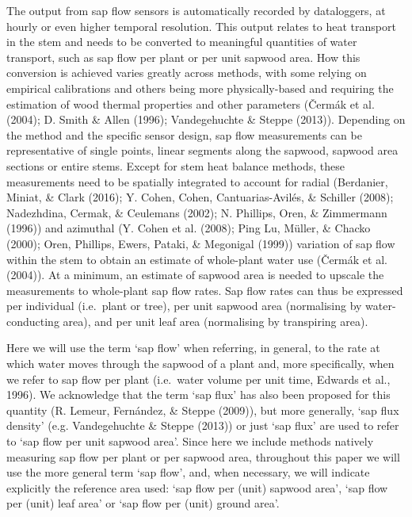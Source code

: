 \documentclass[11pt,twoside]{reedthesis}
\begin{document}
The output from sap flow sensors is automatically recorded by
dataloggers, at hourly or even higher temporal resolution. This output
relates to heat transport in the stem and needs to be converted to
meaningful quantities of water transport, such as sap flow per plant or
per unit sapwood area. How this conversion is achieved varies greatly
across methods, with some relying on empirical calibrations and others
being more physically-based and requiring the estimation of wood thermal
properties and other parameters (Čermák et al. (2004); D. Smith \& Allen
(1996); Vandegehuchte \& Steppe (2013)). Depending on the method and the
specific sensor design, sap flow measurements can be representative of
single points, linear segments along the sapwood, sapwood area sections
or entire stems. Except for stem heat balance methods, these
measurements need to be spatially integrated to account for radial
(Berdanier, Miniat, \& Clark (2016); Y. Cohen, Cohen, Cantuarias-Avilés,
\& Schiller (2008); Nadezhdina, Cermak, \& Ceulemans (2002); N.
Phillips, Oren, \& Zimmermann (1996)) and azimuthal (Y. Cohen et al.
(2008); Ping Lu, Müller, \& Chacko (2000); Oren, Phillips, Ewers,
Pataki, \& Megonigal (1999)) variation of sap flow within the stem to
obtain an estimate of whole-plant water use (Čermák et al. (2004)). At a
minimum, an estimate of sapwood area is needed to upscale the
measurements to whole-plant sap flow rates. Sap flow rates can thus be
expressed per individual (i.e.~plant or tree), per unit sapwood area
(normalising by water-conducting area), and per unit leaf area
(normalising by transpiring area).\par

Here we will use the term `sap flow' when referring, in general, to the
rate at which water moves through the sapwood of a plant and, more
specifically, when we refer to sap flow per plant (i.e.~water volume per
unit time, Edwards et al., 1996). We acknowledge that the term `sap
flux' has also been proposed for this quantity (R. Lemeur, Fernández, \&
Steppe (2009)), but more generally, `sap flux density' (e.g.
Vandegehuchte \& Steppe (2013)) or just `sap flux' are used to refer to
`sap flow per unit sapwood area'. Since here we include methods natively
measuring sap flow per plant or per sapwood area, throughout this paper
we will use the more general term `sap flow', and, when necessary, we
will indicate explicitly the reference area used: `sap flow per (unit)
sapwood area', `sap flow per (unit) leaf area' or `sap flow per (unit)
ground area'.\par 
\end{document}
